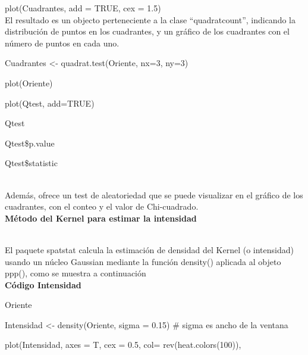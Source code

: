 \documentclass[12pt]{report}
\begin{document}
{{{{{{	plot(Cuadrantes, add = TRUE, cex = 1.5) }}\\   

	El resultado es un objecto perteneciente a la clase  “quadratcount'',  indicando la distribución de puntos en los cuadrantes, y un gráfico de los cuadrantes con el número de puntos en cada uno.\\ 
	
		{ \scriptsize  { \ttfamily	
				 
	 Cuadrantes <- quadrat.test(Oriente, nx=3, ny=3)   %
	 
     plot(Oriente)                                %
     
     plot(Qtest, add=TRUE)

     Qtest

     Qtest\$p.value    \vspace{-0,15 cm}     
                                                                                  
     Qtest\$statistic                      }}\\


Además, ofrece un test de aleatoriedad que se puede visualizar en el gráfico de los cuadrantes, con el conteo y el valor de Chi-cuadrado.\\



     \textbf{Método del Kernel para estimar la intensidad }{\label{I4-codigo}\\
      
      El paquete spatstat calcula la estimación de densidad del Kernel (o intensidad)  usando un núcleo Gaussian mediante la función density() aplicada al objeto  ppp(), como se muestra a continuación \\
 
 
  	
  \textbf{Código Intensidad}\\
  
  { \scriptsize  { \ttfamily  	
  		
  		Oriente
  		
  		Intensidad <- density(Oriente, sigma = 0.15)  \#  sigma es ancho de la ventana 
  		
  		plot(Intensidad, axes = T, cex = 0.5, col= rev(heat.colors(100)), 
  		
}}}}}}}
\end{document}

